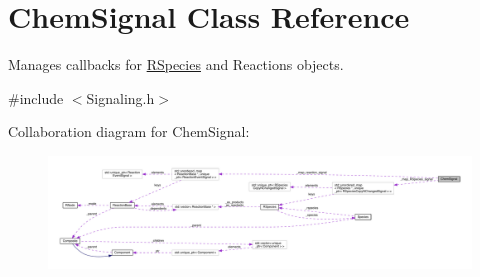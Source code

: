 \hypertarget{classChemSignal}{\section{Chem\+Signal Class Reference}
\label{classChemSignal}
}


Manages callbacks for \hyperlink{classRSpecies}{R\+Species} and Reactions objects.  




{\ttfamily \#include $<$Signaling.\+h$>$}



Collaboration diagram for Chem\+Signal\+:\nopagebreak
\begin{figure}[H]
\begin{center}
\leavevmode
\includegraphics[width=350pt]{classChemSignal__coll__graph}
\end{center}
\end{figure}
